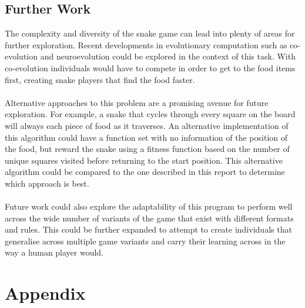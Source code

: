 \documentclass[12pt]{article}
\begin{document}
\subsection{Further Work}
The complexity and diversity of the snake game can lead into plenty of areas for further exploration. Recent developments in evolutionary computation such as co-evolution and neuroevolution could be explored in the context of this task. With co-evolution individuals would have to compete in order to get to the food items first, creating snake players that find the food faster.
\\\\
Alternative approaches to this problem are a promising avenue for future exploration. For example, a snake that cycles through every square on the board will always each piece of food as it traverses. An alternative implementation of this algorithm could have a function set with no information of the position of the food, but reward the snake using a fitness function based on the number of unique squares visited before returning to the start position. This alternative algorithm could be compared to the one described in this report to determine which approach is best.
\\\\
Future work could also explore the adaptability of this program to perform well across the wide number of variants of the game that exist with different formats and rules. This could be further expanded to attempt to create individuals that generalise across multiple game variants and carry their learning across in the way a human player would.

\newpage
{}


\newpage
\section{Appendix}
\end{document}
